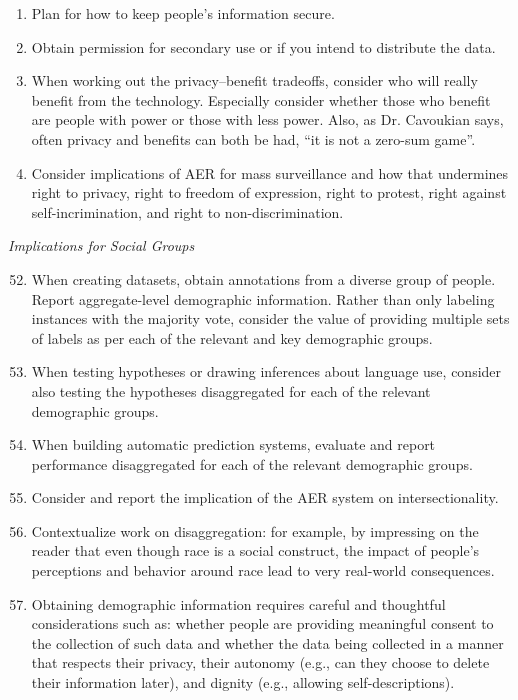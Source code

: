 \documentclass{clv3}
\begin{document}
{\begin{enumerate}
Consider harm mitigation strategies such as: anonymization techniques and differential privacy. Beware that these can vary in effectiveness.
\item Plan for how to keep people's information secure.
\item Obtain permission for secondary use or if you intend to distribute the data.
\item When working out the privacy–benefit tradeoffs, consider who will really benefit from the technology. Especially consider whether those who benefit are people with power or those with less power. Also, as Dr. Cavoukian says, often privacy and benefits can both be had, “it is not a zero-sum game”.
\item Consider implications of AER for mass surveillance and how that undermines right to privacy, right to freedom of expression, right to protest, right against self-incrimination, and right to non-discrimination.
\end{enumerate}
\noindent \textit{Implications for Social Groups}
\begin{enumerate}
  \setcounter{enumi}{51}
\item When creating datasets, obtain annotations from a diverse group of people. Report aggregate-level demographic information. Rather than only labeling instances with the majority vote, consider the value of providing multiple sets of labels as per each of the relevant and key demographic groups.
\item When testing hypotheses or drawing inferences about language use, consider also testing the hypotheses disaggregated for each of the relevant demographic groups.
\item When building automatic prediction systems, evaluate and report performance disaggregated for each of the relevant demographic groups.
\item Consider and report the implication of the AER system on intersectionality.
\item Contextualize work on disaggregation: for example, by impressing on the reader that even though race is a social construct, the impact of people’s perceptions and behavior around race lead to very real-world consequences.
\item Obtaining demographic information requires careful and thoughtful considerations such as: whether people are providing meaningful consent to the collection of such data and whether the data being collected in a manner that respects their privacy, their autonomy (e.g., can they choose to delete their information later), and dignity (e.g., allowing self-descriptions).
\end{enumerate}
}

\starttwocolumn

\end{document}
